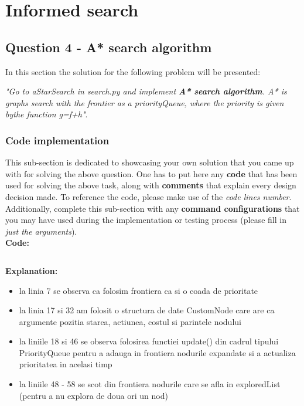 \section{Informed search}
\subsection{Question 4 - A* search  algorithm}
In this section the solution for the following problem will be presented: \newline


\textit{"Go to aStarSearch in search.py and implement \textbf{A* search algorithm}. A* is graphs search with the frontier as a priorityQueue, where the priority is given bythe function g=f+h"}.


\subsubsection{Code implementation}
This sub-section is dedicated to showcasing your own solution that you came up with for solving the above question. One has to put here any \textbf{code} that has been used for solving the above task, along with \textbf{comments} that explain every design decision made. To reference the code, please make use of the \textit{code lines number}. Additionally, complete this sub-section with any \textbf{command configurations} that you may have used during the implementation or testing process (please fill in \textit{just the arguments}). \\

\textbf{Code:}
    \inputminted[linenos]{python}{code/04_a_star.py}


\textbf{Explanation:}
\begin{itemize}
    \setlength\itemsep{0em}
    \item la linia 7 se observa ca folosim frontiera ca si o coada de prioritate
\item la linia 17 si 32 am folosit o structura de date CustomNode care are ca argumente pozitia starea, actiunea, costul si parintele nodului
\item la liniile 18 si 46 se observa folosirea functiei update() din cadrul tipului PriorityQueue pentru a adauga in frontiera nodurile expandate si a actualiza prioritatea in acelasi timp
\item la liniile 48 - 58  se scot din frontiera nodurile care se afla in exploredList (pentru a nu explora de doua ori un nod)

\end{itemize}


